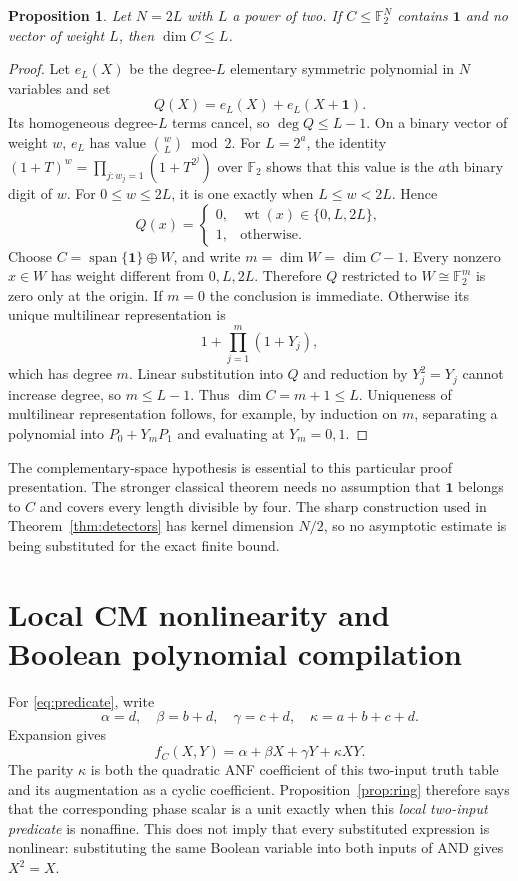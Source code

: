 \documentclass[11pt,a4paper]{article}
\newtheorem{proposition}[theorem]{Proposition}
\theoremstyle{definition}\newtheorem{definition}[theorem]{Definition}
\theoremstyle{remark}\newtheorem{remark}[theorem]{Remark}
\newcommand{\F}{\mathbb F}
\newcommand{\wt}{\operatorname{wt}}
\newcommand{\Span}{\operatorname{span}}
\numberwithin{equation}{section}
\begin{document}
\begin{proposition}\label{prop:polynomial}
Let $N=2L$ with $L$ a power of two. If $C\le\F_2^N$ contains $\mathbf1$ and no vector of weight $L$, then $\dim C\le L$.
\end{proposition}
\begin{proof}
Let $e_L(X)$ be the degree-$L$ elementary symmetric polynomial in $N$ variables and set
\[
 Q(X)=e_L(X)+e_L(X+\mathbf1).
\]
Its homogeneous degree-$L$ terms cancel, so $\deg Q\le L-1$. On a binary vector of weight $w$, $e_L$ has value $\binom{w}{L}\bmod2$. For $L=2^a$, the identity
$(1+T)^w=\prod_{j:w_j=1}(1+T^{2^j})$ over $\F_2$ shows that this value is the $a$th binary digit of $w$. For $0\le w\le2L$, it is one exactly when $L\le w<2L$. Hence
\[
 Q(x)=\begin{cases}0,&\wt(x)\in\{0,L,2L\},\\1,&\text{otherwise}.\end{cases}
\]
Choose $C=\Span\{\mathbf1\}\mathbin{\oplus}W$, and write $m=\dim W=\dim C-1$. Every nonzero $x\in W$ has weight different from $0,L,2L$. Therefore $Q$ restricted to $W\cong\F_2^m$ is zero only at the origin. If $m=0$ the conclusion is immediate. Otherwise its unique multilinear representation is
\[
 1+\prod_{j=1}^m(1+Y_j),
\]
which has degree $m$. Linear substitution into $Q$ and reduction by $Y_j^2=Y_j$ cannot increase degree, so $m\le L-1$. Thus $\dim C=m+1\le L$. Uniqueness of multilinear representation follows, for example, by induction on $m$, separating a polynomial into $P_0+Y_mP_1$ and evaluating at $Y_m=0,1$.
\end{proof}
The complementary-space hypothesis is essential to this particular proof presentation. The stronger classical theorem needs no assumption that $\mathbf1$ belongs to $C$ and covers every length divisible by four. The sharp construction used in Theorem~\ref{thm:detectors} has kernel dimension $N/2$, so no asymptotic estimate is being substituted for the exact finite bound.

\section{Local CM nonlinearity and Boolean polynomial compilation}\label{app:local}
For \eqref{eq:predicate}, write
\[
 \alpha=d,\quad\beta=b+d,\quad\gamma=c+d,\quad\kappa=a+b+c+d.
\]
Expansion gives
\begin{equation}\label{eq:local}
 f_C(X,Y)=\alpha+\beta X+\gamma Y+\kappa XY.
\end{equation}
The parity $\kappa$ is both the quadratic ANF coefficient of this two-input truth table and its augmentation as a cyclic coefficient. Proposition~\ref{prop:ring} therefore says that the corresponding phase scalar is a unit exactly when this \emph{local two-input predicate} is nonaffine. This does not imply that every substituted expression is nonlinear: substituting the same Boolean variable into both inputs of AND gives $X^2=X$.
\end{document}

